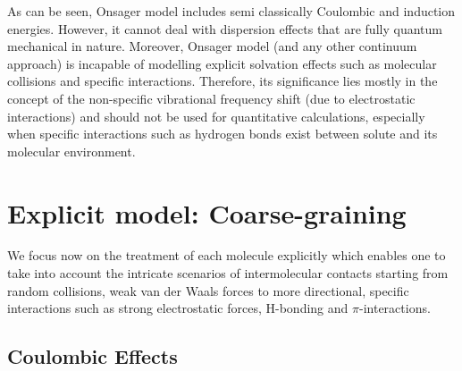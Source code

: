 \documentclass[a4paper,titlepage,twoside,fleqn,12pt]{book}
\begin{document}
\begin{refsection}
As can be seen, Onsager model includes semi classically
Coulombic and induction energies. However, it cannot
deal with dispersion effects that are fully quantum mechanical
in nature. Moreover,
Onsager model (and any other continuum approach) 
is incapable of modelling
explicit solvation effects such as molecular collisions
and specific interactions. Therefore, its significance
lies mostly in the concept of the non\hyp{}specific
vibrational frequency shift (due to electrostatic
interactions) and should not be used for quantitative
calculations, especially when specific interactions such as
hydrogen bonds exist between solute and its molecular environment.


\section{Explicit model: Coarse-graining\label{s:vibr-solv-explicit-models}}

We focus now on the treatment of each molecule
explicitly which enables one to take into account
the intricate scenarios of intermolecular contacts
starting from random collisions, weak van der Waals
forces to more directional, specific interactions
such as strong electrostatic forces, H-bonding and
$\pi$-interactions.

\subsection{Coulombic Effects\label{s:dw-coul}}


\end{refsection}
\end{document}
